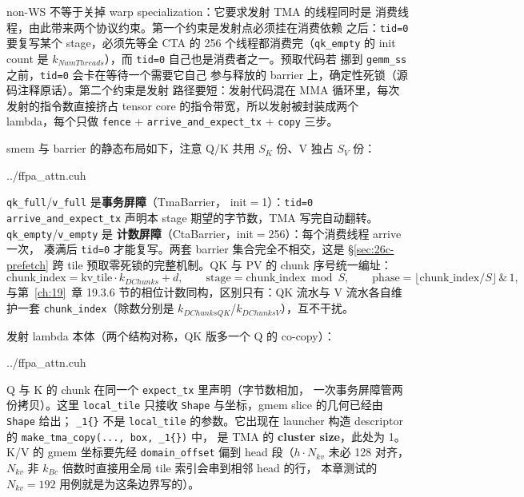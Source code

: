non-WS 不等于关掉 warp specialization：它要求发射 TMA 的线程同时是
消费线程，由此带来两个协议约束。第一个约束是发射点必须挂在消费依赖
之后：\texttt{tid=0} 要复写某个 stage，必须先等全 CTA 的
256 个线程都消费完（\texttt{qk\_empty} 的 init count 是
$k_{NumThreads}$），而 \texttt{tid=0} 自己也是消费者之一。预取代码若
挪到 \texttt{gemm\_ss} 之前，\texttt{tid=0} 会卡在等待一个需要它自己
参与释放的 barrier 上，确定性死锁（源码注释原话）。第二个约束是发射
路径要短：发射代码混在 MMA 循环里，每次发射的指令数直接挤占
tensor core 的指令带宽，所以发射被封装成两个 lambda，每个只做
\texttt{fence} + \texttt{arrive\_and\_expect\_tx} + \texttt{copy} 三步。

smem 与 barrier 的静态布局如下，注意 Q/K 共用 $S_K$ 份、V 独占
$S_V$ 份：

\begin{lstinputlisting}[linerange={880-913},firstnumber=auto,
  title={ffpa\_attn.cuh L880-913（smem 三段池；full/empty 双 barrier 集初始化）}]{../ffpa_attn.cuh}
\end{lstinputlisting}

\texttt{qk\_full}/\texttt{v\_full} 是\textbf{事务屏障}（TmaBarrier，
init$=$1）：\texttt{tid=0} \texttt{arrive\_and\_expect\_tx} 声明本 stage
期望的字节数，TMA 写完自动翻转。\texttt{qk\_empty}/\texttt{v\_empty} 是
\textbf{计数屏障}（CtaBarrier，init$=$256）：每个消费线程 arrive 一次，
凑满后 \texttt{tid=0} 才能复写。两套 barrier 集合完全不相交，这是
\S\ref{sec:26c-prefetch} 跨 tile 预取零死锁的完整机制。QK 与 PV 的
chunk 序号统一编址：
\begin{equation}\label{eq:26c-phase}
  \text{chunk\_index} = \text{kv\_tile} \cdot k_{DChunks} + d,\qquad
  \text{stage} = \text{chunk\_index} \bmod S,\qquad
  \text{phase} = \big\lfloor \text{chunk\_index}/S \big\rfloor \,\&\,1,
\end{equation}
与第~\ref{ch:19}~章 19.3.6 节的相位计数同构，区别只有：QK 流水与
V 流水各自维护一套 \texttt{chunk\_index}（除数分别是
$k_{DChunksQK}$/$k_{DChunksV}$），互不干扰。

发射 lambda 本体（两个结构对称，QK 版多一个 Q 的 co-copy）：

\begin{lstinputlisting}[linerange={975-1006},firstnumber=auto,
  title={ffpa\_attn.cuh L975-1006（\texttt{issue\_qk\_tma}/\texttt{issue\_v\_tma}：tid=0 内联发射）}]{../ffpa_attn.cuh}
\end{lstinputlisting}

Q 与 K 的 chunk 在同一个 \texttt{expect\_tx} 里声明（字节数相加，
一次事务屏障管两份拷贝）。这里 \texttt{local\_tile} 只接收
\texttt{Shape} 与坐标，gmem slice 的几何已经由 \texttt{Shape} 给出；
\texttt{\_1\{\}} 不是 \texttt{local\_tile} 的参数。它出现在 launcher
构造 descriptor 的 \texttt{make\_tma\_copy(..., box, \_1\{\})} 中，
是 TMA 的 \textbf{cluster size}，此处为 1。K/V 的 gmem 坐标要先经
\texttt{domain\_offset} 偏到 head 段（$h \cdot N_{kv}$ 未必 128 对齐，
$N_{kv}$ 非 $k_{Bc}$ 倍数时直接用全局 tile 索引会串到相邻 head 的行，
本章测试的 $N_{kv}{=}192$ 用例就是为这条边界写的）。

